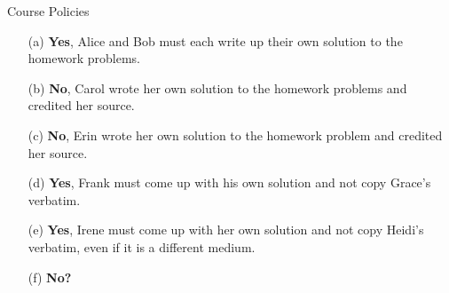 \begin{homeworkProblem}{Course Policies}
    \begin{itemize}
        \item[(a)] \textbf{Yes}, Alice and Bob must each write up their own 
        solution to the homework problems.
        \item[(b)] \textbf{No}, Carol wrote her own solution to the 
        homework problems and credited her source.
        \item[(c)] \textbf{No}, Erin wrote her own solution to the homework 
        problem and credited her source.
        \item[(d)] \textbf{Yes}, Frank must come up with his own solution 
        and not copy Grace's verbatim. 
        \item[(e)] \textbf{Yes}, Irene must come up with her own solution 
        and not copy Heidi's verbatim, even if it is a different medium.
        \item[(f)] \textbf{No?}
    \end{itemize}
    
\end{homeworkProblem}